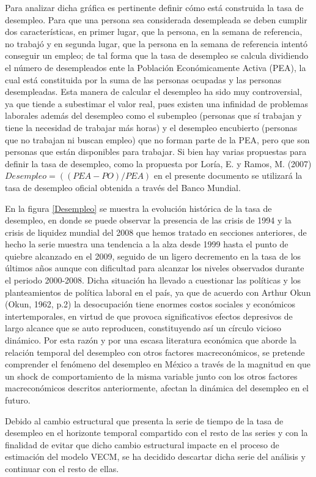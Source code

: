 Para analizar dicha gráfica es pertinente definir cómo está construida la tasa de desempleo. Para que una persona sea considerada desempleada se deben cumplir dos características, en primer lugar, que la persona, en la semana de referencia, no trabajó y en segunda lugar, que la persona en la semana de referencia intentó conseguir un empleo; de tal forma que la tasa de desempleo se calcula dividiendo el número de desempleados ente la Población Económicamente Activa (PEA), la cual está constituida por la suma de las personas ocupadas y las personas desempleadas. Esta manera de calcular el desempleo ha sido muy controversial, ya que tiende a subestimar el valor real, pues existen una infinidad de problemas laborales además del desempleo como el subempleo (personas que sí trabajan y tiene la necesidad de trabajar más horas)  y el desempleo encubierto (personas que no trabajan ni buscan empleo) que no forman parte de la PEA, pero que son personas que están disponibles para trabajar. Si bien hay varias propuestas para definir la tasa de desempleo, como la propuesta por Loría, E. y Ramos, M. (2007) $Desempleo = ((PEA-PO)/PEA)$ en el presente documento se utilizará la tasa de desempleo oficial obtenida a través del Banco Mundial.\bigskip

En la figura  \ref{Desempleo} se muestra la evolución histórica de la tasa de desempleo, en donde se puede observar la presencia de las crisis de 1994 y la crisis de liquidez mundial del 2008 que hemos tratado en secciones anteriores, de hecho la serie muestra una tendencia a la alza desde 1999 hasta el punto de quiebre alcanzado en el 2009, seguido de un ligero decremento en la tasa de los últimos años aunque con dificultad para alcanzar los niveles observados durante el periodo 2000-2008. Dicha situación ha llevado a cuestionar las políticas y los planteamientos de política laboral en el país,  ya que de acuerdo con Arthur Okun (Okun, 1962, p.2) la desocupación tiene enormes costos sociales y económicos intertemporales, en virtud de que provoca significativos efectos depresivos de largo alcance que se auto reproducen, constituyendo así un círculo vicioso dinámico. Por esta razón y por una escasa literatura económica que aborde la relación temporal del desempleo con otros factores macreconómicos, se pretende comprender el fenómeno del desempleo en México a través de la magnitud en que un shock de comportamiento de la misma variable junto con los otros factores macreconómicos descritos anteriormente, afectan la dinámica del desempleo en el futuro.\bigskip

Debido al cambio estructural que presenta la serie de tiempo de la tasa de desempleo en el horizonte temporal compartido con el resto de las series y con la finalidad de evitar que dicho cambio estructural impacte en el proceso de estimación del modelo VECM, se ha decidido descartar dicha serie del análisis y continuar con el resto de ellas.